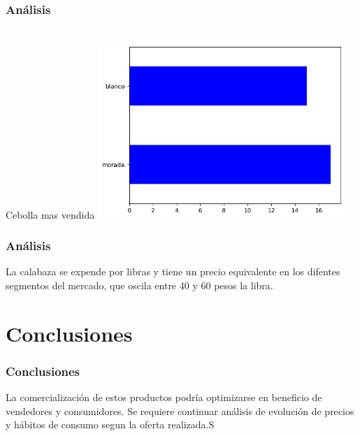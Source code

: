 \documentclass{beamer}
\begin{document}
\newpage
\begin{frame}
\frametitle{Análisis}\\Cebolla mas vendida
\includegraphics[width=0.7\textwidth]{Ceb_mas_vendida.png}
\end{frame}

\newpage
\begin{frame}
\frametitle{Análisis}
La calabaza se expende por libras y tiene un precio equivalente en los difentes segmentos del mercado, que oscila entre 40 y 60 pesos la libra.
\end{frame}


\section{Conclusiones}
\begin{frame}
\frametitle{Conclusiones}

La comercialización de estos productos podría optimizarse en beneficio de vendedores y consumidores. Se requiere continuar análisis de evolución de precios y hábitos de consumo segun la oferta realizada.S

\end{frame}
\end{document}
